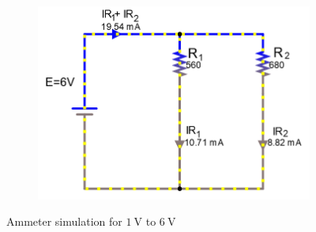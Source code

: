 \documentclass[a4paper]{article}
\begin{document}
\begin{figure}[H]
\begin{subfigure}{0.48\textwidth}
\end{subfigure}
\begin{subfigure}{0.48\textwidth}
\includegraphics[width=1.16\linewidth]{amps_6}
\end{subfigure}
\caption{Ammeter simulation for $\SI{1}{\volt}$ to $\SI{6}{\volt}$}
\label{fig:4}
\end{figure}
\end{document}
